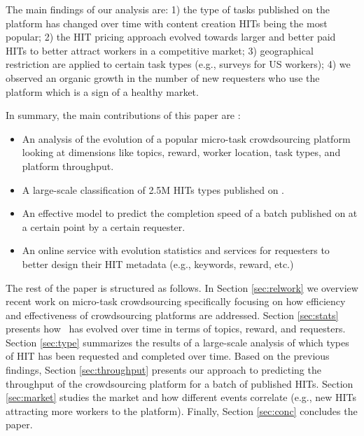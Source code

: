 The main findings of our analysis are: 1) the type of tasks published on the platform has changed over time with content creation HITs being the most popular; 2) the HIT pricing approach evolved towards larger and better paid HITs to better attract workers in a competitive market; 3) geographical restriction are applied to certain task types (e.g., surveys for US workers); 4) we observed an organic growth in the number of new requesters who use the platform which is a sign of a healthy market.


In summary, the main contributions of this paper are :
\begin{itemize}

	\item An analysis of the evolution of a popular micro-task crowdsourcing platform looking at dimensions like topics, reward, worker location, task types, and platform throughput.

	\item A large-scale classification of 2.5M HITs types published on \amt{}.

	\item An effective model to predict the completion speed of a batch published on \amt{} at a certain point by a certain requester.

	\item An online service with evolution statistics and services for requesters to better design their HIT metadata (e.g., keywords, reward, etc.)

\end{itemize}


The rest of the paper is structured as follows.
In Section \ref{sec:relwork} we overview recent work on micro-task crowdsourcing specifically focusing on how  efficiency and effectiveness  of crowdsourcing platforms are addressed.
Section \ref{sec:stats} presents how \amt\ has evolved over time in terms of topics, reward, and requesters.
Section \ref{sec:type} summarizes the results of a large-scale analysis of which types of HIT has been requested and completed over time.
Based on the previous findings, Section \ref{sec:throughput} presents our approach to predicting the throughput of the crowdsourcing platform for a batch of published HITs.
Section \ref{sec:market} studies the \amt{} market and how different events correlate (e.g., new HITs attracting more workers to the platform).
Finally, Section \ref{sec:conc} concludes the paper.

